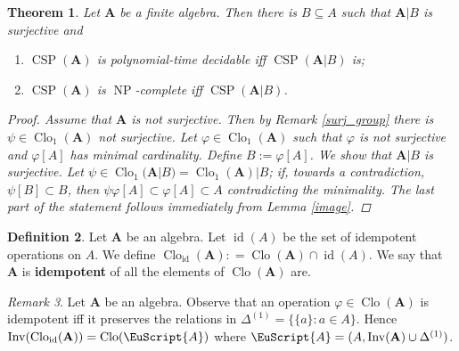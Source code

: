 \documentclass{amsart}
\theoremstyle{plain}
\newtheorem{theorem}{Theorem}[section]
\theoremstyle{definition}
\newtheorem{definition}[theorem]{Definition}
\theoremstyle{remark}
\newtheorem{remark}[theorem]{Remark}
\def\phi{\varphi}
\DeclareMathOperator{\Clo}{Clo}
\DeclareMathOperator{\CSP}{CSP}
\DeclareMathOperator{\Inv}{Inv}
\DeclareMathOperator{\NP}{NP}
\DeclareMathOperator{\id}{id}
\begin{document}
\begin{theorem}
    \label{thm_minimal}
    Let $\mathbf{A}$ be a finite algebra. 
    Then there is $B \subseteq A$ such that $\mathbf{A}|B$ is surjective and 
    \begin{enumerate}
        \item $\CSP(\mathbf{A})$ is polynomial-time decidable iff $\CSP(\mathbf{A}|B)$ is; 
        \item $\CSP(\mathbf{A})$ is $\NP$-complete iff $\CSP(\mathbf{A}|B)$.
    \end{enumerate}
    \begin{proof}
        Assume that $\mathbf{A}$ is not surjective. 
        Then by Remark \ref{surj_group} there is $\psi \in \Clo_1(\mathbf{A})$ not surjective. 
        Let $\phi \in \Clo_1(\mathbf{A})$ such that $\phi$ is not surjective and $\phi[A]$ has minimal cardinality. 
        Define $B:=\phi[A]$. 
        We show that $\mathbf{A}|B$ is surjective. 
        Let $\psi \in \Clo_1(\mathbf{A}|B) = \Clo_1(\mathbf{A})|B $;
        if, towards a contradiction, $\psi[B] \subset B$, then $\psi \phi [A] \subset \phi[A] \subset A$ contradicting the minimality. 
        The last part of the statement follows immediately from Lemma \ref{image}. 
    \end{proof}
\end{theorem}

\begin{definition}
    Let $\mathbf{A}$ be an algebra. 
    Let $\id(A)$ be the set of idempotent operations on $A$. 
    We define $\Clo_{\id}(\mathbf{A}): = \Clo(\mathbf{A}) \cap \id(A)$. 
    We say that $\mathbf{A}$ is \textbf{idempotent} of all the elements of $\Clo(\mathbf{A})$ are. 
\end{definition}

\begin{remark}
    \label{idempotent}
    Let $\mathbf{A}$ be an algebra.  
    Observe that an operation $\phi \in \Clo(\mathbf{A})$ is idempotent iff it preserves the relations in $\Delta^{(1)}=\{\{a\} : a \in A\}$. 
    Hence $\Inv(\Clo_{\id}(\mathbf{A})) = \Clo(\EuScript{A})$ where $\EuScript{A}=(A, \Inv(\mathbf{A}) \cup \Delta^{(1)})$. 
\end{remark}
\end{document}
